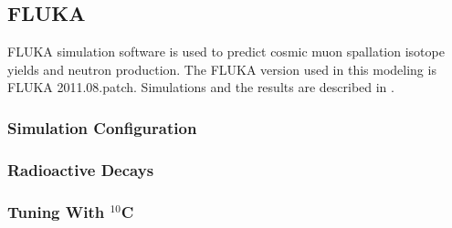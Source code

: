 \subsection{FLUKA}
FLUKA simulation software is used to predict cosmic muon spallation isotope yields and neutron production. The FLUKA version used in this modeling is FLUKA 2011.08.patch. Simulations and the results are described in \cite{klz_zenon_spallation}.
\subsubsection*{Simulation Configuration}

\subsubsection*{Radioactive Decays}
\subsubsection*{Tuning With $^{10}$C}

